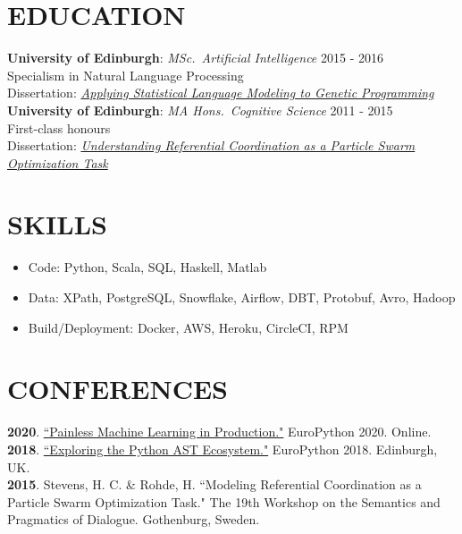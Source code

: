 \documentclass[line, margin]{res}
\begin{document}
\begin{resume}
\section{EDUCATION}
\textbf{University of Edinburgh}: \textit{MSc.\ Artificial Intelligence} \hfill 2015 - 2016\\
Specialism in Natural Language Processing \\
Dissertation: \textit{\href{http://www.chasestevens.com/papers/msc_dissertation.pdf}{Applying Statistical Language Modeling to Genetic Programming}}\\[5pt]
\textbf{University of Edinburgh}: \textit{MA Hons.\ Cognitive Science} \hfill 2011 - 2015\\
First-class honours\\
Dissertation: \textit{\href{http://www.chasestevens.com/papers/undergrad_dissertation.pdf}{Understanding Referential Coordination as a Particle Swarm Optimization Task}}

\section{SKILLS}
\begin{itemize}[leftmargin=10pt]
\item Code: Python, Scala, SQL, Haskell, Matlab
\item Data: XPath, PostgreSQL, Snowflake, Airflow, DBT, Protobuf, Avro, Hadoop
\item Build/Deployment: Docker, AWS, Heroku, CircleCI, RPM
\end{itemize}

\section{CONFERENCES}
\textbf{2020}. \href{https://www.youtube.com/watch?v=8Zn4hV9xE1I}{``Painless Machine Learning in Production."} EuroPython 2020. Online. \\[5pt]
\textbf{2018}. \href{https://www.youtube.com/watch?v=Yq3wTWkoaYY}{``Exploring the Python AST Ecosystem."} EuroPython 2018. Edinburgh, UK. \\[5pt]
\textbf{2015}. Stevens, H. C. \& Rohde, H. ``Modeling Referential Coordination as a Particle Swarm Optimization Task." The 19th Workshop on the Semantics and Pragmatics of Dialogue. Gothenburg, Sweden.


\end{resume}
\end{document}
